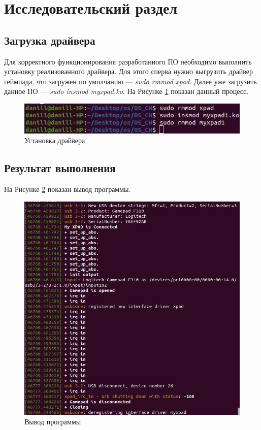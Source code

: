 \section{Исследовательский раздел}
\subsection{Загрузка драйвера}
Для корректного функционирования разработанного ПО необходимо
выполнить установку реализованного драйвера. Для этого сперва нужно выгрузить драйвер геймпада, что загружен по умолчанию ---
\textit{sudo rmmod xpad}. Далее уже загрузить данное ПО --- \textit{sudo insmod myxpad.ko}. На Рисунке \ref{sudo} показан данный процесс.

\begin{figure}[h!]
	\centering
	\includegraphics[scale=0.9]{img/sudo.jpg}
	\caption{Установка драйвера}
	\label{sudo}
\end{figure}\par

\subsection{Результат выполнения}
На Рисунке \ref{dmesg} показан вывод программы.
\begin{figure}[h!]
	\centering
	\includegraphics[scale=0.9]{img/ex1.jpg}
	\caption{Вывод программы}
	\label{dmesg}
\end{figure}\par

\pagebreak
